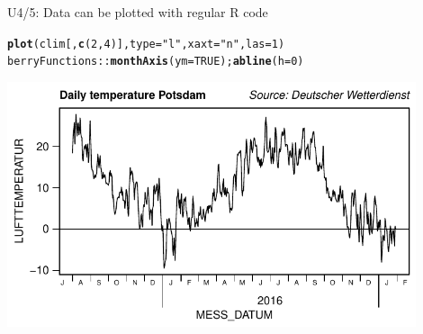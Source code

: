 \documentclass[compress, xcolor=dvipsnames]{beamer}\usepackage[]{graphicx}\usepackage[]{color}
\makeatletter
\newcommand{\hlnum}[1]{\textcolor[rgb]{0.686,0.059,0.569}{#1}}%
\newcommand{\hlstr}[1]{\textcolor[rgb]{0.192,0.494,0.8}{#1}}%
\newcommand{\hlopt}[1]{\textcolor[rgb]{0,0,0}{#1}}%
\newcommand{\hlstd}[1]{\textcolor[rgb]{0.345,0.345,0.345}{#1}}%
\newcommand{\hlkwc}[1]{\textcolor[rgb]{0.333,0.667,0.333}{#1}}%
\newcommand{\hlkwd}[1]{\textcolor[rgb]{0.737,0.353,0.396}{\textbf{#1}}}%
\newenvironment{kframe}{%
 \def\at@end@of@kframe{}%
 \ifinner\ifhmode%
  \def\at@end@of@kframe{\end{minipage}}%
  \begin{minipage}{\columnwidth}%
 \fi\fi%
 \def\FrameCommand##1{\hskip\@totalleftmargin \hskip-\fboxsep
 \colorbox{shadecolor}{##1}\hskip-\fboxsep
     \hskip-\linewidth \hskip-\@totalleftmargin \hskip\columnwidth}%
 \MakeFramed {\advance\hsize-\width
   \@totalleftmargin\z@ \linewidth\hsize
   \@setminipage}}%
 {\par\unskip\endMakeFramed%
 \at@end@of@kframe}
\newenvironment{knitrout}{}{} %
\makeatother
\begin{document}

\begin{frame}[fragile]{U4/5: Data can be plotted with regular R code}
\label{up}
\pause
\begin{knitrout}
\color{fgcolor}\begin{kframe}
\begin{alltt}
\hlkwd{plot}\hlstd{(clim[,}\hlkwd{c}\hlstd{(}\hlnum{2}\hlstd{,}\hlnum{4}\hlstd{)],} \hlkwc{type}\hlstd{=}\hlstr{"l"}\hlstd{,} \hlkwc{xaxt}\hlstd{=}\hlstr{"n"}\hlstd{,} \hlkwc{las}\hlstd{=}\hlnum{1}\hlstd{)}
\hlstd{berryFunctions}\hlopt{::}\hlkwd{monthAxis}\hlstd{(}\hlkwc{ym}\hlstd{=}\hlnum{TRUE}\hlstd{)   ;}   \hlkwd{abline}\hlstd{(}\hlkwc{h}\hlstd{=}\hlnum{0}\hlstd{)}
\end{alltt}
\end{kframe}
\includegraphics[width=0.9\textwidth]{figure/tempplot-1} 

\end{knitrout}
\end{frame}



\end{document}
